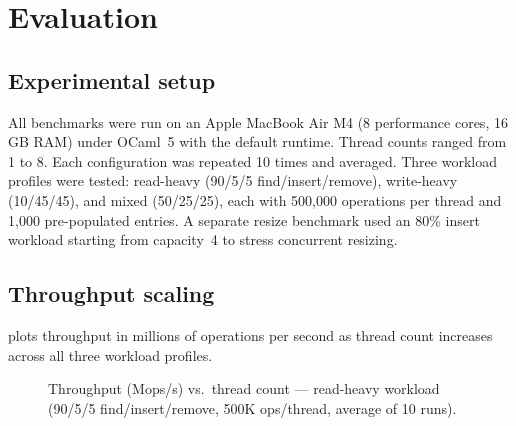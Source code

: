 \documentclass[11pt,a4paper]{article}
\begin{document}
\section{Evaluation}
\label{sec:evaluation}

\subsection{Experimental setup}

All benchmarks were run on an Apple MacBook Air M4 (8 performance cores,
16\,GB RAM) under OCaml~5 with the default runtime. Thread counts ranged from
1 to 8. Each configuration was repeated 10 times and averaged. Three workload
profiles were tested: read-heavy (90/5/5 find/insert/remove), write-heavy
(10/45/45), and mixed (50/25/25), each with 500{,}000 operations per thread
and 1{,}000 pre-populated entries. A separate resize benchmark used an 80\%
insert workload starting from capacity~4 to stress concurrent resizing.

\subsection{Throughput scaling}

 plots
throughput in millions of operations per second as thread count increases
across all three workload profiles.

\begin{figure}[ht]
\centering
{}
\caption{Throughput (Mops/s) vs.\ thread count --- read-heavy workload
(90/5/5 find/insert/remove, 500K ops/thread, average of 10 runs).}
\label{fig:throughput-read}
\end{figure}
\end{document}
